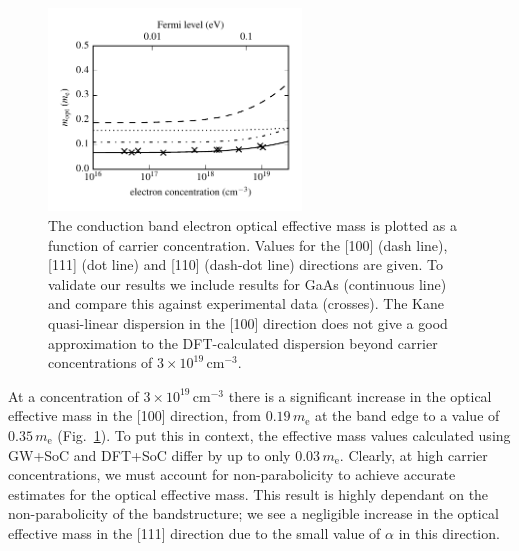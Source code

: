 \begin{figure}[tb] \centering
\includegraphics[width=0.6\textwidth]{./figures/ch4/optical_mass_concentration_MAPI.pdf}
\caption[Electron effective mass as a function of carrier concentration]{\label{optical_concentration_plot} The conduction band electron optical effective mass is plotted as a function of carrier concentration. Values for the [100] (dash line), [111] (dot line) and [110] (dash-dot line) directions are given. To validate our results we include results for GaAs (continuous line) and compare this against experimental data (crosses).\autocite{Raymond1979} The Kane quasi-linear dispersion in the [100] direction does not give a good approximation to the DFT-calculated dispersion beyond carrier concentrations of $3\!\times\!10^{19}\,\mathrm{cm}^{-3}$. }
\end{figure}

At a concentration of $3\!\times\!10^{19}\,\mathrm{cm}^{-3}$ there is a significant increase in the optical effective mass in the [100] direction, from $0.19\,m_\text{e}$ at the band edge to a value of $0.35\,m_\text{e}$ (Fig.\ \ref{optical_concentration_plot}). 
To put this in context, the effective mass values calculated using GW+SoC and DFT+SoC differ by up to only $0.03\,m_\text{e}$.\autocite{Umari2014}
Clearly, at high carrier concentrations, we must account for non-parabolicity to achieve accurate estimates for the optical effective mass.
This result is highly dependant on the non-parabolicity of the bandstructure; we see a negligible increase in the optical effective mass in the [111] direction due to the small value of $\alpha$ in this direction. 

